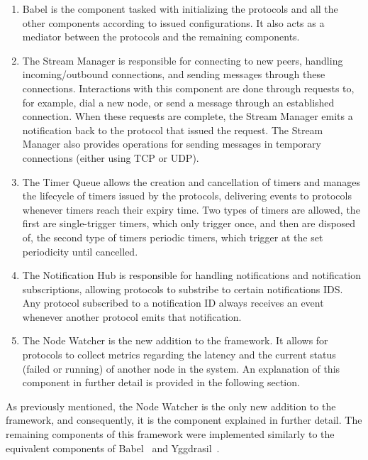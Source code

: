 \begin{enumerate}

    \item Babel is the component tasked with initializing the protocols and all the other components according to issued configurations. It also acts as a mediator between the protocols and the remaining components.

    \item The Stream Manager is responsible for connecting to new peers, handling incoming/outbound connections, and sending messages through these connections. Interactions with this component are done through requests to, for example, dial a new node, or send a message through an established connection. When these requests are complete, the Stream Manager emits a notification back to the protocol that issued the request. The Stream Manager also provides operations for sending messages in temporary connections (either using TCP or UDP).

    \item The Timer Queue allows the creation and cancellation of timers and manages the lifecycle of timers issued by the protocols, delivering events to protocols whenever timers reach their expiry time. Two types of timers are allowed, the first are single-trigger timers, which only trigger once, and then are disposed of, the second type of timers periodic timers, which trigger at the set periodicity until cancelled.

    \item The Notification Hub is responsible for handling notifications and notification subscriptions, allowing protocols to substribe to certain notifications IDS. Any protocol subscribed to a notification ID always receives an event whenever another protocol emits that notification.

    \item The Node Watcher is the new addition to the framework. It allows for protocols to collect metrics regarding the latency and the current status (failed or running) of another node in the system. An explanation of this component in further detail is provided in the following section.

\end{enumerate}

As previously mentioned, the  Node Watcher is the only new addition to the framework, and consequently, it is the component explained in further detail. The remaining components of this framework were implemented similarly to the equivalent components of Babel~\cite{babel} and Yggdrasil~\cite{akosThesis}.

